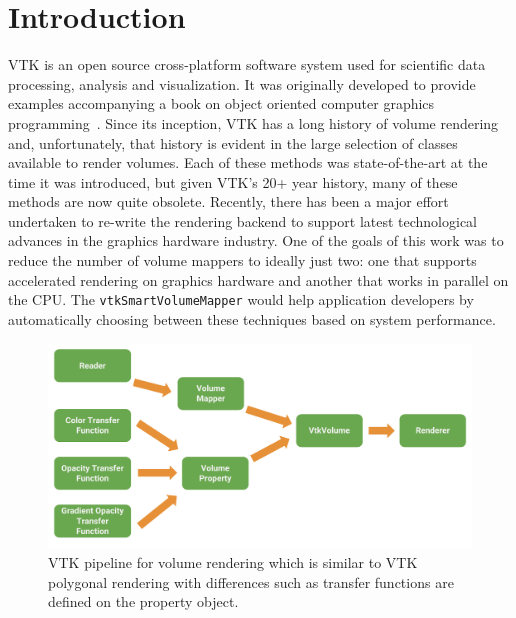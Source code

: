 \section{Introduction}
\label{introduction}
VTK is an open source cross-platform software system used for scientific data
processing, analysis and visualization. It was originally developed to provide
examples accompanying a book on object oriented computer graphics
programming~\citep{schroeder_visualization_2006, geveci_vtk_2012}.  Since its
inception, VTK has a long history of volume rendering and, unfortunately, that
history is evident in the large selection of classes available to render
volumes. Each of these methods was state-of-the-art at the time it was
introduced, but given VTK’s 20+ year history, many of these methods are now
quite obsolete. Recently, there has been a major
effort~\citep{hanwell_visualization_2015} undertaken to re-write the rendering
backend to support latest technological advances in the graphics hardware
industry. One of the goals of this work was to reduce the number of volume
mappers to ideally just two: one that supports accelerated rendering on graphics
hardware and another that works in parallel on the CPU. The
\texttt{vtkSmartVolumeMapper} would help application developers by automatically
choosing between these techniques based on system performance. 

\begin{figure}[ht]
  \centering
  \includegraphics[width=\columnwidth]{vtk_volume_pipeline.pdf}
  \caption{VTK pipeline for volume rendering which is similar to VTK polygonal
    rendering with differences such as transfer functions are defined on the
    property object.}
  \label{fig:pipeline}
\end{figure}%

